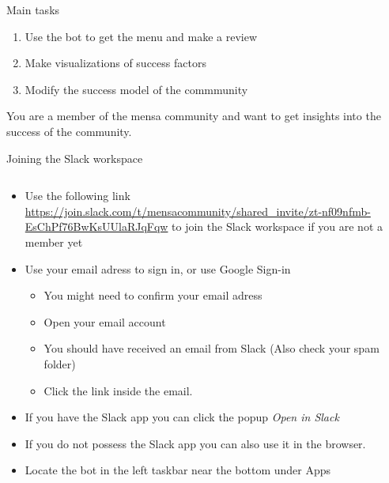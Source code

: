 \begin{frame}{Main tasks}
  \begin{enumerate}
    \item Use the bot to get the menu and make a review
    \item Make visualizations of success factors
    \item Modify the success model of the commmunity
  \end{enumerate}
  
You are a member of the mensa community and want to get insights into the success of the community.

\end{frame}


\begin{frame}{Joining the Slack workspace}
  \begin{columns}
    \begin{column}[]{0.7\textwidth}
      \begin{itemize}
        \item Use the following link \\
         \url{https://join.slack.com/t/mensacommunity/shared_invite/zt-nf09nfmb-EsChPf76BwKsUUlaRJqFqw} to join the Slack workspace if you are not a member yet
        \item Use your email adress to sign in, or use Google Sign-in
         \begin{itemize}
          \item You might need to confirm your email adress
          \item Open your email account
          \item You should have received an email from Slack (Also check your spam folder)
          \item  Click the link inside the email. 
        \end{itemize}
       \item If you have the Slack app you can click the popup \emph{Open in Slack}
        \item If you do not possess the Slack app you can also use it in the browser.
        \item  Locate the bot in the left taskbar near the bottom under Apps
      \end{itemize}


\end{column}
\end{columns}
\end{frame}
